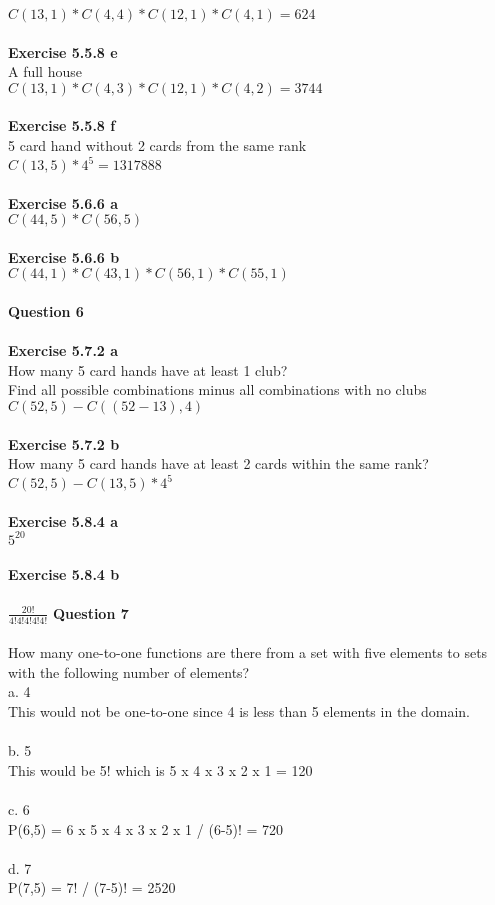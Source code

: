 \documentclass{article}
\begin{document}
$C(13,1) * C(4,4) * C(12,1) * C(4,1) = 624$\\\\
\textbf{Exercise 5.5.8 e}\\
A full house\\
$C(13,1) * C(4,3) * C(12,1)*C(4,2) = 3744$\\\\
\textbf{Exercise 5.5.8 f}\\
5 card hand without 2 cards from the same rank\\
$C(13,5) * 4^5 = 1317888$\\\\
\textbf{Exercise 5.6.6 a}\\
$C(44,5) * C(56,5)$\\\\
\textbf{Exercise 5.6.6 b}\\
$C(44,1) * C(43,1) * C(56,1) * C(55,1)$\\\\
\newpage
\noindent \textbf{Question 6}\\\\
\textbf{Exercise 5.7.2 a}\\
How many 5 card hands have at least 1 club?\\
Find all possible combinations minus all combinations with no clubs\\
$C(52,5) - C((52-13),4)$\\\\
\textbf{Exercise 5.7.2 b}\\
How many 5 card hands have at least 2 cards within the same rank?\\
$C(52,5) - C(13,5)*4^5$\\\\
\textbf{Exercise 5.8.4 a}\\
$5^{20}$\\\\
\textbf{Exercise 5.8.4 b}\\\\
$\frac{20!}{4!4!4!4!4!}$
\newpage
\noindent \textbf{Question 7}\\\\
How many one-to-one functions are there from a set with five elements to sets with the following number of elements?\\
a. 4\\
This would not be one-to-one since 4 is less than 5 elements in the domain.\\\\
b. 5\\
This would be 5! which is 5 x 4 x 3 x 2 x 1 = 120\\\\
c. 6\\
P(6,5) = 6 x 5 x 4 x 3 x 2 x 1 / (6-5)! = 720 \\\\
d. 7\\
P(7,5) = 7! / (7-5)! = 2520
\end{document}

